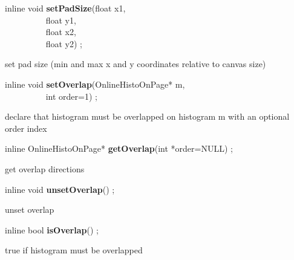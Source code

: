 \item      inline void {\bf setPadSize}(float x1,\\\mbox{}~~~~~~~~~ float y1,\\\mbox{}~~~~~~~~~ float x2,\\\mbox{}~~~~~~~~~ float y2) ;

 set pad size (min and max x and y coordinates relative to canvas size)


\item      inline void {\bf setOverlap}(OnlineHistoOnPage* m,\\\mbox{}~~~~~~~~~ int order=1) ;

 declare that histogram must be overlapped on histogram m with an optional order index


\item      inline OnlineHistoOnPage* {\bf getOverlap}(int *order=NULL) ;

 get overlap directions


\item      inline void {\bf unsetOverlap}() ;

 unset overlap


\item      inline bool {\bf isOverlap}() ;

 true if histogram must be overlapped



